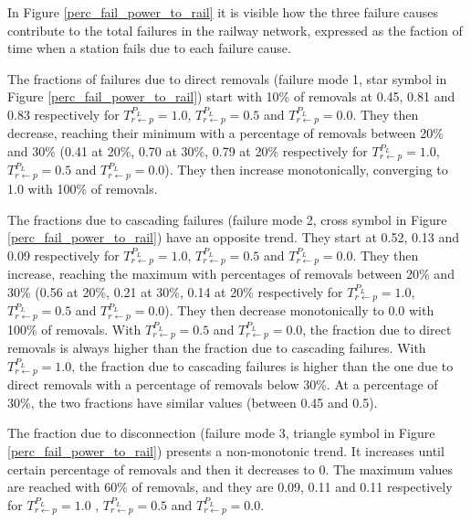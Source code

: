 \documentclass[review]{elsarticle}
\begin{document}
In Figure \ref{perc_fail_power_to_rail} it is visible how the three failure causes contribute to the total failures in the railway network, expressed as the faction of time when a station fails due to each failure cause.

The fractions of failures due to direct removals (failure mode 1, star symbol in Figure \ref{perc_fail_power_to_rail}) start with 10\% of removals at 0.45, 0.81 and 0.83 respectively for $T_{r \leftarrow p}^{P_L}=1.0$, $T_{r \leftarrow p}^{P_L}=0.5$ and $T_{r \leftarrow p}^{P_L}=0.0$. They then decrease, reaching their minimum with a percentage of removals between 20\% and 30\% (0.41 at 20\%, 0.70 at 30\%, 0.79 at 20\% respectively for $T_{r \leftarrow p}^{P_L}=1.0$, $T_{r \leftarrow p}^{P_L}=0.5$ and $T_{r \leftarrow p}^{P_L}=0.0$). They then increase monotonically, converging to 1.0 with 100\% of removals.

The fractions due to cascading failures (failure mode 2, cross symbol in Figure \ref{perc_fail_power_to_rail}) have an opposite trend. They start at 0.52, 0.13 and 0.09 respectively for $T_{r \leftarrow p}^{P_L}=1.0$, $T_{r \leftarrow p}^{P_L}=0.5$ and $T_{r \leftarrow p}^{P_L}=0.0$. They then increase, reaching the maximum with percentages of removals between 20\% and 30\% (0.56 at 20\%, 0.21 at 30\%, 0.14 at 20\% respectively for $T_{r \leftarrow p}^{P_L}=1.0$, $T_{r \leftarrow p}^{P_L}=0.5$ and $T_{r \leftarrow p}^{P_L}=0.0$). They then decrease monotonically to 0.0 with 100\% of removals. With $T_{r \leftarrow p}^{P_L}=0.5$ and $T_{r \leftarrow p}^{P_L}=0.0$, the fraction due to direct removals is always higher than the fraction due to cascading failures. With $T_{r \leftarrow p}^{P_L}=1.0$, the fraction due to cascading failures is higher than the one due to direct removals with a percentage of removals below 30\%. At a percentage of 30\%, the two fractions have similar values (between 0.45 and 0.5).

The fraction due to disconnection (failure mode 3, triangle symbol in Figure \ref{perc_fail_power_to_rail}) presents a non-monotonic trend. It increases until certain percentage of removals and then it decreases to 0. The maximum values are reached with 60\% of removals, and they are 0.09, 0.11 and 0.11 respectively for $T_{r \leftarrow p}^{P_L}=1.0$ , $T_{r \leftarrow p}^{P_L}=0.5$ and $T_{r \leftarrow p}^{P_L}=0.0$.

	
\end{document}
